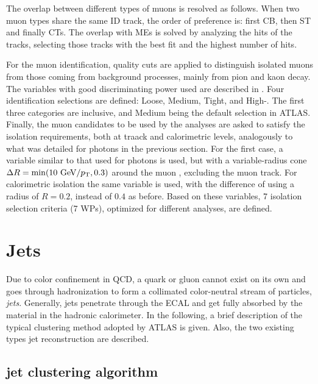 The overlap between different types of muons is resolved as follows. When two muon types share the same \ac{ID} track, the order of preference is: first \ac{CB}, then \ac{ST} and finally \acp{CT}. The overlap with \acp{ME} is solved by analyzing the hits of the tracks, selecting those tracks with the best fit and the highest number of hits.

For the muon identification, quality cuts are applied to distinguish isolated muons from those coming from background processes, mainly from pion and kaon decay.
The variables with good discriminating power used are described in . Four identification selections are defined: Loose, Medium, Tight, and High-\pt. The first three categories are inclusive, and Medium being the default selection in \ac{ATLAS}. Finally, the muon candidates to be used by the analyses are asked to satisfy the isolation requirements, both at traack and calorimetric levels, analogously to what was detailed for photons in the previous section. For the first case, a variable similar to that used for photons is used, but with a variable-radius cone \(\Delta R = \min(10~\text{GeV}/p_{\text{T}}, 0.3)\) around the muon \pt, excluding the muon track. For calorimetric isolation the same variable \etconefo is used, with the difference of using a radius of \(R=0.2\), instead of \(0.4\) as before. Based on these variables, 7 isolation selection criteria (7 \acp{WP}), optimized for different analyses, are defined.








\section{Jets}


Due to color confinement in \ac{QCD}, a quark or gluon cannot exist on its own and goes through hadronization to form a collimated color-neutral stream of particles, \textit{jets}. Generally, jets penetrate through the \ac{ECAL} and get fully absorbed by the material in the hadronic calorimeter. In the following, a brief description of the typical clustering method adopted by \ac{ATLAS} is given. Also, the two existing types jet reconstruction are described.


\subsection{\Antikt jet clustering algorithm}

